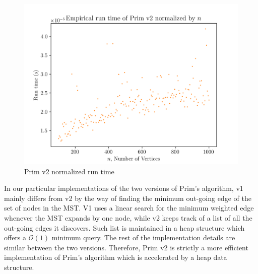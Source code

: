 \documentclass[titlepage, 12pt]{article}
\begin{document}
\begin{figure}[h]
  \centering
  \includegraphics[width=0.8\linewidth]{v2norm} 
  \caption{Prim v2 normalized run time}
  \label{fig:v2norm}
\end{figure}

In our particular implementations of the two versions of Prim's algorithm, v1
mainly differs from v2 by the way of finding the minimum out-going edge of the
set of nodes in the MST. V1 uses a linear search for the minimum weighted edge
whenever the MST expands by one node, while v2 keeps track of a list of all the
out-going edges it discovers. Such list is maintained in a heap structure which
offers a \(\mathcal{O}(1)\) minimum query. The rest of the implementation
details are similar between the two versions. Therefore, Prim v2 is strictly a
more efficient implementation of Prim's algorithm which is accelerated by a heap
data structure.
\end{document}
